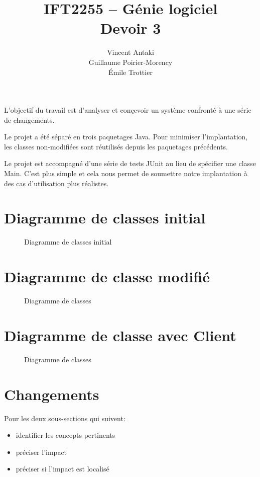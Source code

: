 \documentclass{article}
\title{IFT2255 -- Génie logiciel \\Devoir 3}
\author{Vincent Antaki \\ Guillaume Poirier-Morency \\ Émile Trottier}
\begin{document}
  \maketitle

  \abstract
  L'objectif du travail est d'analyser et conçevoir un système confronté à une
  série de changements.

  Le projet a été séparé en trois paquetages Java. Pour minimiser
  l'implantation, les classes non-modifiées sont réutilisés depuis les
  paquetages précédents.

  Le projet est accompagné d'une série de tests JUnit au lieu de spécifier une
  classe \textsf{Main}. C'est plus simple et cela nous permet de soumettre notre
  implantation à des cas d'utilisation plus réalistes.

  \section{Diagramme de classes initial}
  \begin{sidewaysfigure}
    \centering
    \resizebox{\textwidth}{!}{}
    \caption{Diagramme de classes initial}
  \end{sidewaysfigure}

  \section{Diagramme de classe modifié}
  \begin{sidewaysfigure}
    \centering
    \resizebox{\textwidth}{!}{}
    \caption{Diagramme de classes}
  \end{sidewaysfigure}

  \section{Diagramme de classe avec \textsf{Client}}
  \begin{sidewaysfigure}
    \centering
    \resizebox{\textwidth}{!}{}
    \caption{Diagramme de classes}
  \end{sidewaysfigure}

  \section{Changements}

  Pour les deux sous-sections qui suivent:
  \begin{itemize}
    \item identifier les concepts pertinents
    \item préciser l'impact
    \item préciser si l'impact est localisé
  \end{itemize}
\end{document}
